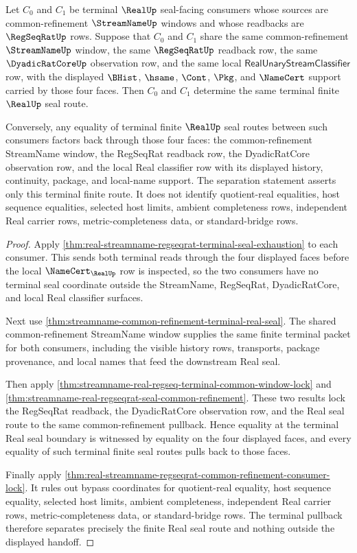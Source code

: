 \begin{theorem}
\label{thm:real-streamname-regseqrat-terminal-pullback-separation}
Let $C_0$ and $C_1$ be terminal $\RealUp$ seal-facing consumers whose
sources are common-refinement $\StreamNameUp$ windows and whose readbacks are
$\RegSeqRatUp$ rows. Suppose that $C_0$ and $C_1$ share the same
common-refinement $\StreamNameUp$ window, the same $\RegSeqRatUp$ readback
row, the same $\DyadicRatCoreUp$ observation row, and the same local
$\mathsf{RealUnaryStreamClassifier}$ row, with the displayed $\BHist$,
$\hsame$, $\Cont$, $\Pkg$, and $\NameCert$ support carried by those four
faces. Then $C_0$ and $C_1$ determine the same terminal finite $\RealUp$ seal
route.

Conversely, any equality of terminal finite $\RealUp$ seal routes between
such consumers factors back through those four faces: the common-refinement
StreamName window, the RegSeqRat readback row, the DyadicRatCore observation
row, and the local Real classifier row with its displayed history,
continuity, package, and local-name support. The separation statement asserts
only this terminal finite route. It does not identify quotient-real
equalities, host sequence equalities, selected host limits, ambient
completeness rows, independent Real carrier rows, metric-completeness data,
or standard-bridge rows.
\end{theorem}
\begin{proof}
Apply
\autoref{thm:real-streamname-regseqrat-terminal-seal-exhaustion} to each
consumer. This sends both terminal reads through the four displayed faces
before the local $\NameCert_{\RealUp}$ row is inspected, so the two consumers
have no terminal seal coordinate outside the StreamName, RegSeqRat,
DyadicRatCore, and local Real classifier surfaces.

Next use \autoref{thm:streamname-common-refinement-terminal-real-seal}. The
shared common-refinement StreamName window supplies the same finite terminal
packet for both consumers, including the visible history rows, transports,
package provenance, and local names that feed the downstream Real seal.

Then apply \autoref{thm:streamname-real-regseq-terminal-common-window-lock}
and \autoref{thm:streamname-real-regseqrat-seal-common-refinement}. These two
results lock the RegSeqRat readback, the DyadicRatCore observation row, and
the Real seal route to the same common-refinement pullback. Hence equality at
the terminal Real seal boundary is witnessed by equality on the four displayed
faces, and every equality of such terminal finite seal routes pulls back to
those faces.

Finally apply
\autoref{thm:real-streamname-regseqrat-common-refinement-consumer-lock}. It
rules out bypass coordinates for quotient-real equality, host sequence
equality, selected host limits, ambient completeness, independent Real carrier
rows, metric-completeness data, or standard-bridge rows. The terminal
pullback therefore separates precisely the finite Real seal route and nothing
outside the displayed handoff.
\end{proof}

